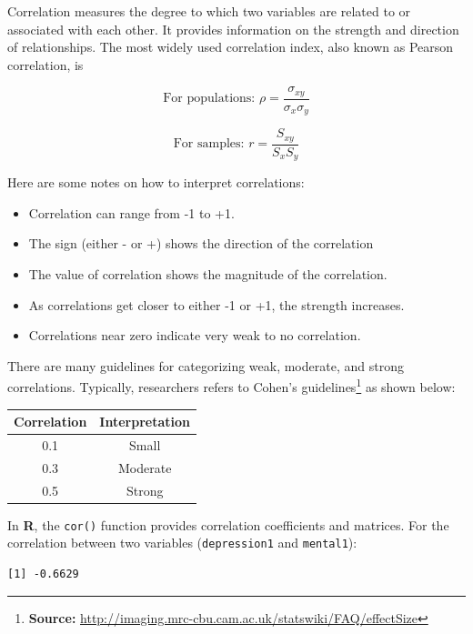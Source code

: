 \documentclass[]{book}
\newenvironment{Shaded}{\begin{snugshade}}{\end{snugshade}}
\newcommand{\KeywordTok}[1]{\textcolor[rgb]{0.13,0.29,0.53}{\textbf{#1}}}
\newcommand{\NormalTok}[1]{#1}
\newcommand{\OperatorTok}[1]{\textcolor[rgb]{0.81,0.36,0.00}{\textbf{#1}}}
\let\rmarkdownfootnote\footnote%
\def\footnote{\protect\rmarkdownfootnote}
\begin{document}
Correlation measures the degree to which two variables are related to or associated with each other. It provides information on the strength and direction of relationships. The most widely used correlation index, also known as Pearson correlation, is

\[\text{For populations: } \rho = \frac{\sigma_{xy}}{\sigma_x \sigma_y}\]

\[\text{For samples: } r = \frac{S_{xy}}{S_x S_y}\]

Here are some notes on how to interpret correlations:

\begin{itemize}
\item
  Correlation can range from -1 to +1.
\item
  The sign (either - or +) shows the direction of the correlation
\item
  The value of correlation shows the magnitude of the correlation.
\item
  As correlations get closer to either -1 or +1, the strength increases.
\item
  Correlations near zero indicate very weak to no correlation.
\end{itemize}

There are many guidelines for categorizing weak, moderate, and strong correlations. Typically, researchers refers to Cohen's guidelines\footnote{\textbf{Source:} \url{http://imaging.mrc-cbu.cam.ac.uk/statswiki/FAQ/effectSize}} as shown below:

\begin{longtable}[]{@{}cc@{}}
\toprule
Correlation & Interpretation\tabularnewline
\midrule
\endhead
0.1 & Small\tabularnewline
0.3 & Moderate\tabularnewline
0.5 & Strong\tabularnewline
\bottomrule
\end{longtable}

In \textbf{R}, the \texttt{cor()} function provides correlation coefficients and matrices. For the correlation between two variables (\texttt{depression1} and \texttt{mental1}):

\begin{Shaded}
\end{Shaded}

\begin{verbatim}
[1] -0.6629
\end{verbatim}
\end{document}
